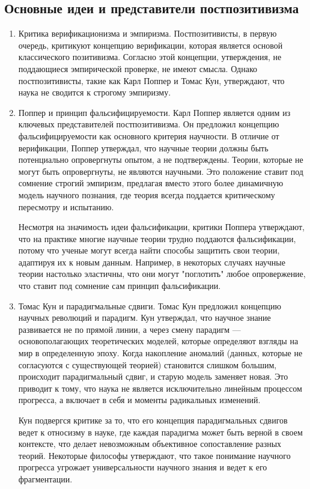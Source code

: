 \documentclass[12pt,a4paper]{article}
\begin{document}
	\subsection{Основные идеи и представители постпозитивизма}
	\begin{enumerate}
		\item Критика верификационизма и эмпиризма. Постпозитивисты, в первую очередь, критикуют концепцию верификации, которая является основой классического позитивизма. Согласно этой концепции, утверждения, не поддающиеся эмпирической проверке, не имеют смысла. Однако постпозитивисты, такие как Карл Поппер и Томас Кун, утверждают, что наука не сводится к строгому эмпиризму.
		
		\item Поппер и принцип фальсифицируемости. Карл Поппер является одним из ключевых представителей постпозитивизма. Он предложил концепцию фальсифицируемости как основного критерия научности. В отличие от верификации, Поппер утверждал, что научные теории должны быть потенциально опровергнуты опытом, а не подтверждены. Теории, которые не могут быть опровергнуты, не являются научными. Это положение ставит под сомнение строгий эмпиризм, предлагая вместо этого более динамичную модель научного познания, где теория всегда поддается критическому пересмотру и испытанию.
		
		Несмотря на значимость идеи фальсификации, критики Поппера утверждают, что на практике многие научные теории трудно поддаются фальсификации, потому что ученые могут всегда найти способы защитить свои теории, адаптируя их к новым данным. Например, в некоторых случаях научные теории настолько эластичны, что они могут "поглотить" любое опровержение, что ставит под сомнение сам принцип фальсификации.
		
		\item Томас Кун и парадигмальные сдвиги. Томас Кун предложил концепцию научных революций и парадигм. Кун утверждал, что научное знание развивается не по прямой линии, а через смену парадигм — основополагающих теоретических моделей, которые определяют взгляды на мир в определенную эпоху. Когда накопление аномалий (данных, которые не согласуются с существующей теорией) становится слишком большим, происходит парадигмальный сдвиг, и старую модель заменяет новая. Это приводит к тому, что наука не является исключительно линейным процессом прогресса, а включает в себя и моменты радикальных изменений.
		
		Кун подвергся критике за то, что его концепция парадигмальных сдвигов ведет к относизму в науке, где каждая парадигма может быть верной в своем контексте, что делает невозможным объективное сопоставление разных теорий. Некоторые философы утверждают, что такое понимание научного прогресса угрожает универсальности научного знания и ведет к его фрагментации.
		

\end{enumerate}
\end{document}
